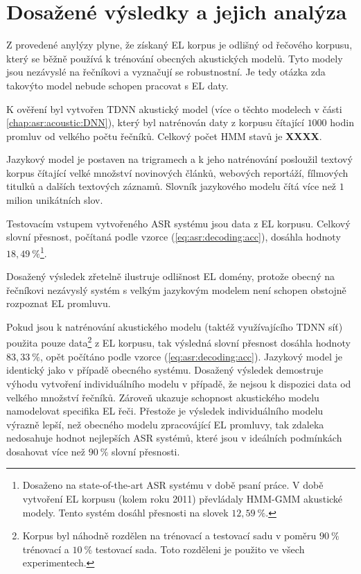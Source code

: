 \section{Dosažené výsledky a jejich analýza}
\label{chap:construction:results}

Z provedené anylýzy plyne, že získaný EL korpus je odlišný od  řečového korpusu, který se běžně používá k trénování obecných akustických modelů. Tyto modely jsou nezávyslé na řečníkovi a vyznačují se robustnostní. Je tedy otázka zda takovýto model nebude schopen pracovat s EL daty.

K ověření byl vytvořen TDNN akustický model (více o těchto modelech v části \ref{chap:asr:acoustic:DNN}), který byl natrénován daty z korpusu čítající $1000$ hodin promluv od velkého počtu řečníků. Celkový počet HMM stavů je \textbf{XXXX}.

Jazykový model je postaven na trigramech a k jeho natrénování posloužil textový korpus čítající velké množství novinových článků, webových reportáží, fílmových titulků a dalších textových záznamů. Slovník jazykového modelu čítá více než $1$ milion unikátních slov.

Testovacím vstupem vytvořeného ASR systému jsou data z EL korpusu. Celkový slovní přesnost, počítaná podle vzorce (\ref{eq:asr:decoding:acc}), dosáhla hodnoty $18,49\ \%$\footnote{Dosaženo na state-of-the-art ASR systému v době psaní práce. V době vytvoření EL korpusu (kolem roku 2011) převládaly HMM-GMM akustické modely. Tento systém dosáhl přesnosti na slovek $12,59\ \%$.}.

Dosažený výsledek zřetelně ilustruje odlišnost EL domény, protože obecný na řečníkovi nezávyslý systém s velkým jazykovým modelem není schopen obstojně rozpoznat EL promluvu.

Pokud jsou k natrénování akustického modelu (taktéž využívajícího TDNN síť) použita pouze data\footnote{Korpus byl náhodně rozdělen na trénovací a testovací sadu v poměru $90\ \%$ trénovací a $10\ \%$ testovací sada. Toto rozděleni je použito ve všech experimentech.} z EL korpusu, tak výsledná slovní přesnost dosáhla hodnoty $83,33\ \%$, opět počítáno podle vzorce (\ref{eq:asr:decoding:acc}). Jazykový model je identický jako v případě obecného systému. Dosažený výsledek demostruje výhodu vytvoření individuálního modelu v případě, že nejsou k dispozici data od velkého množství řečníků. Zároveň ukazuje schopnost akustického modelu namodelovat specifika EL řeči. Přestože je výsledek individuálního modelu výrazně lepší, než obecného modelu zpracovájící EL promluvy, tak zdaleka nedosahuje hodnot nejlepších ASR systémů, které jsou v ideálních podmínkách dosahovat více než $90\ \%$ slovní přesnosti.


